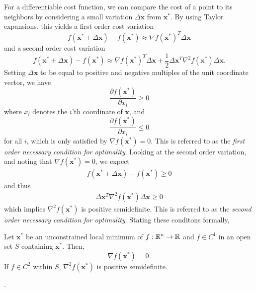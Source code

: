 For a differentiable cost function, we can compare the cost of a point to its neighbors by considering a small variation $\Delta \bm{x}$ from $\bm{x}^*$. By using Taylor expansions, this yields a first order cost variation
\begin{equation}
    f(\bm{x}^* + \Delta \bm{x}) - f(\bm{x}^*) \approx \nabla f(\bm{x}^*)^T \Delta \bm{x}
\end{equation}
and a second order cost variation 
\begin{equation}
    f(\bm{x}^* + \Delta \bm{x}) - f(\bm{x}^*) \approx \nabla f(\bm{x}^*)^T \Delta \bm{x} + \frac{1}{2} \Delta \bm{x}^T \nabla^2 f(\bm{x}^*) \Delta \bm{x}.
\end{equation}
Setting $\Delta \bm{x}$ to be equal to positive and negative multiples of the unit coordinate vector, we have 
\begin{equation}
    \frac{\partial f(\bm{x}^*)}{\partial x_i} \geq 0
\end{equation}
where $x_i$ denotes the $i$'th coordinate of $\bm{x}$, and 
\begin{equation}
    \frac{\partial f(\bm{x}^*)}{\partial x_i} \leq 0
\end{equation}
for all $i$, which is only satisfied by $\nabla f(\bm{x}^*) = 0$.  This is referred to as the \textit{first order necessary condition for optimality}. Looking at the second order variation, and noting that $\nabla f(\bm{x}^*) = 0$, we expect
\begin{align}
f(\bm{x}^* + \Delta \bm{x}) - f(\bm{x}^*) \geq 0
\end{align}
and thus
\begin{align}
\Delta \bm{x}^T \nabla^2 f(\bm{x}^*) \Delta \bm{x} \geq 0
\end{align}
which implies $\nabla^2 f(\bm{x}^*)$ is positive semidefinite. This is referred to as the \textit{second order necessary condition for optimality}. Stating these conditons formally, 

\begin{theorem}
Let $\bm{x}^*$ be an unconstrained local minimum of $f:\mathbb{R}^n \to \mathbb{R}$ and $f \in C^1$ in an open set $S$ containing $\bm{x}^*$. Then,
\begin{equation}
    \nabla f(\bm{x}^*) = 0.
\end{equation}
If $f \in C^2$ within $S$, $\nabla^2 f(\bm{x}^*)$ is positive semidefinite. 
\end{theorem}

.

